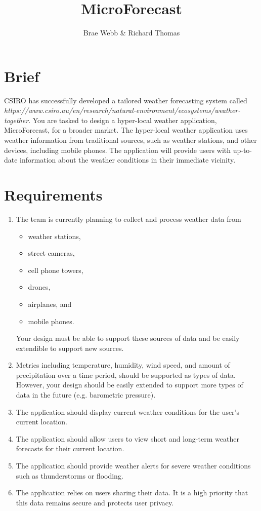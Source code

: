 \documentclass{csse4400}
\title{MicroForecast}
\author{Brae Webb \& Richard Thomas}
\date{\week[tutorial]{3}}
\begin{document}
\maketitle

\section{Brief}

CSIRO has successfully developed a tailored weather forecasting system called \emph{
{https://www.csiro.au/en/research/natural-environment/ecosystems/weather-together}}.
You are tasked to design a hyper-local weather application, MicroForecast, for a broader market.
The hyper-local weather application uses weather information from traditional sources, such as weather stations,
and other devices, including mobile phones.
The application will provide users with up-to-date information about the weather conditions in their immediate vicinity.

\section{Requirements}

\begin{enumerate}
    \item The team is currently planning to collect and process weather data from
        \begin{itemize}[topsep=0pt]
            \item weather stations,
            \item street cameras,
            \item cell phone towers,
            \item drones,
            \item airplanes, and
            \item mobile phones.
        \end{itemize}
        Your design must be able to support these sources of data and be easily extendible to support new sources.
    \item Metrics including temperature, humidity, wind speed, and amount of precipitation over a time period,
          should be supported as types of data.
          However, your design should be easily extended to support more types of data in the future (e.g. barometric pressure).
    \item The application should display current weather conditions for the user's current location.
    \item The application should allow users to view short and long-term weather forecasts for their current location.
    \item The application should provide weather alerts for severe weather conditions such as thunderstorms or flooding.
    \item The application relies on users sharing their data. It is a high priority that this data remains secure and protects user privacy.
\end{enumerate}
\end{document}
